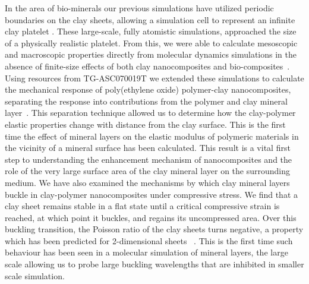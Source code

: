 In the area of bio-minerals our previous simulations have utilized periodic boundaries on the clay sheets, allowing a simulation cell to represent an infinite clay platelet \cite{JPCC_2007,Thyveetil,Thyveetil_JACS, Soft_Matter1, Ratcliffe2009, Anderson2010}. These large-scale, fully atomistic simulations, approached the size of a physically realistic platelet. From this, we were able to calculate mesoscopic and macroscopic properties directly from molecular dynamics simulations in the absence of finite-size effects of both clay nanocomposites\cite{JPCC_2007,Thyveetil, Soft_Matter1} and bio-composites~\cite{Thyveetil_JACS}.  Using resources from TG-ASC070019T we extended these simulations to calculate the mechanical response of poly(ethylene oxide) polymer-clay nanocomposites, separating the response into contributions from the polymer and clay mineral layer~\cite{Soft_Matter1}. This separation technique allowed us to determine how the clay-polymer elastic properties change with distance from the clay surface. This is the first time the effect of mineral layers on the elastic modulus of polymeric materials in the vicinity of a mineral surface has been calculated. This result is a vital first step to understanding the enhancement mechanism of nanocomposites and the role of the very large surface area of the clay mineral layer on the surrounding medium.  We have also examined the mechanisms by which clay mineral layers buckle in clay-polymer nanocomposites under compressive stress. We find that a clay sheet remains stable in a flat state until a critical compressive strain is reached, at which point it buckles, and regains its uncompressed area. Over this buckling transition, the Poisson ratio of the clay sheets turns negative, a property which has been predicted for 2-dimensional sheets ~\cite{Soft_Matter2}. This is the first time such behaviour has been seen in a molecular simulation of mineral layers, the large scale allowing us to probe large buckling wavelengths that are inhibited in smaller scale simulation.
